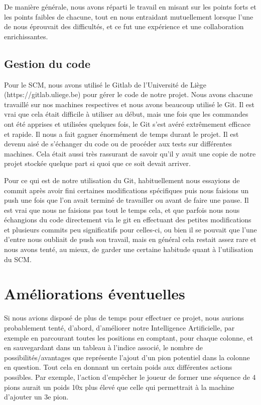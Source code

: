 \documentclass[a4paper, 11pt, oneside]{article}
\begin{document}
De manière générale, nous avons réparti le travail en misant sur les points forts et les points faibles de chacune, tout en nous entraidant mutuellement lorsque l'une de nous éprouvait des difficultés, et ce fut une expérience et une collaboration enrichissantes.

\subsection{Gestion du code}

Pour le SCM, nous avons utilisé le Gitlab de l'Université de Liège (https://gitlab.uliege.be) pour gérer le code de notre projet. Nous avons chacune travaillé sur nos machines respectives et nous avons beaucoup utilisé le Git. Il est vrai que cela était difficile à utiliser au début, mais une fois que les commandes ont été apprises et utilisées quelques fois, le Git s'est avéré extrêmement efficace et rapide. Il nous a fait gagner énormément de temps durant le projet. Il est devenu aisé de s'échanger du code ou de procéder aux tests sur différentes machines. Cela était aussi très rassurant de savoir qu'il y avait une copie de notre projet stockée quelque part si quoi que ce soit devait arriver.

Pour ce qui est de notre utilisation du Git, habituellement nous essayions de commit après avoir fini certaines modifications spécifiques puis nous faisions un push une fois que l'on avait terminé de travailler ou avant de faire une pause. Il est vrai que nous ne faisions pas tout le temps cela, et que parfois nous nous échangions du code directement via le git en effectuant des petites modifications et plusieurs commits peu significatifs pour celles-ci, ou bien il se pouvait que l'une d'entre nous oubliait de push son travail, mais en général cela restait assez rare et nous avons tenté, au mieux, de garder une certaine habitude quant à l'utilisation du SCM.

\section{Améliorations éventuelles}

Si nous avions disposé de plus de temps pour effectuer ce projet, nous aurions probablement tenté, d'abord, d'améliorer notre Intelligence Artificielle, par exemple en parcourant toutes les positions en comptant, pour chaque colonne, et en sauvegardant dans un tableau à l'indice associé, le nombre de possibilités/avantages que représente l'ajout d'un pion potentiel dans la colonne en question. Tout cela en donnant un certain poids aux différentes actions possibles. Par exemple, l'action d'empêcher le joueur de former une séquence de 4 pions aurait un poids 10x plus élevé que celle qui permettrait à la machine d'ajouter un 3e pion.
\end{document}
